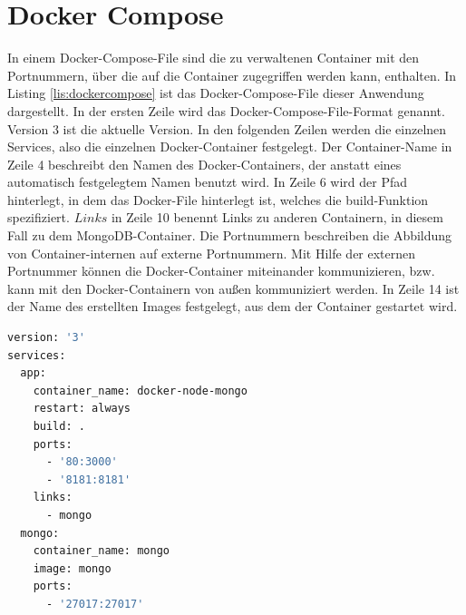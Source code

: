 \section{Docker Compose}\label{sec:Docker-Compose}
In einem Docker-Compose-File sind die zu verwaltenen Container mit den Portnummern, über die auf die Container zugegriffen werden kann, enthalten. In Listing \ref{lis:dockercompose} ist das Docker-Compose-File dieser Anwendung dargestellt. In der ersten Zeile wird das Docker-Compose-File-Format genannt. Version 3 ist die aktuelle Version. In den folgenden Zeilen werden die einzelnen Services, also die einzelnen Docker-Container festgelegt. Der Container-Name in Zeile 4 beschreibt den Namen des Docker-Containers, der anstatt eines automatisch festgelegtem Namen benutzt wird. In Zeile 6 wird der Pfad hinterlegt, in dem das Docker-File hinterlegt ist, welches die build-Funktion spezifiziert. $Links$ in Zeile 10 benennt Links zu anderen Containern, in diesem Fall zu dem MongoDB-Container. Die Portnummern beschreiben die Abbildung von Container-internen auf externe Portnummern. Mit Hilfe der externen Portnummer können die Docker-Container miteinander kommunizieren, bzw. kann mit den Docker-Containern von außen kommuniziert werden. In Zeile 14 ist der Name des erstellten Images festgelegt, aus dem der Container gestartet wird.
\newpage
\begin{lstlisting}[language=bash, caption={docker-compose.yml-File}, label=lis:dockercompose]
version: '3'
services:
  app:
    container_name: docker-node-mongo
    restart: always
    build: .
    ports:
      - '80:3000'
      - '8181:8181'
    links:
      - mongo
  mongo:
    container_name: mongo
    image: mongo
    ports:
      - '27017:27017'


\end{lstlisting}


